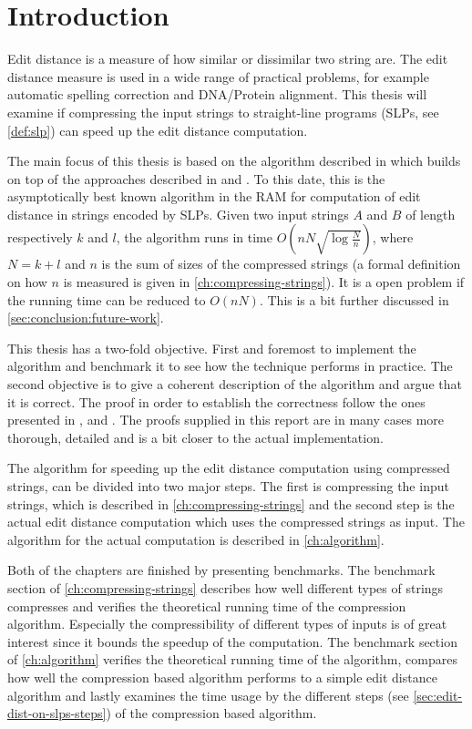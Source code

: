 \documentclass[twoside,11pt,openright]{report}
\begin{document}
\chapter{Introduction}
\label{ch:intro}
Edit distance is a measure of how similar or dissimilar two string are. The edit distance measure is used in a wide range of practical problems, for example automatic spelling correction and DNA/Protein alignment. This thesis will examine if compressing the input strings to straight-line programs (SLPs, see \cref{def:slp}) can speed up the edit distance computation.

The main focus of this thesis is based on the algorithm described in \cite{Gawrychowski:2012:FAC:2422024.2422048} which builds on top of the approaches described in \cite{DBLP:journals/corr/abs-1004-1194} and \cite{DBLP:journals/corr/abs-0707-3619}. To this date, this is the asymptotically best known algorithm in the RAM for computation of edit distance in strings encoded by SLPs. Given two input strings $A$ and $B$ of length respectively $k$ and $l$, the algorithm runs in time $O(n N \sqrt{\log{\frac{N}{n}}})$, where $N = k + l$ and $n$ is the sum of sizes of the compressed strings (a formal definition on how $n$ is measured is given in \cref{ch:compressing-strings}). It is a open problem if the running time can be reduced to $O(nN)$. This is a bit further discussed in \cref{sec:conclusion:future-work}.

This thesis has a two-fold objective. First and foremost to implement the algorithm and benchmark it to see how the technique performs in practice. The second objective is to give a coherent description of the algorithm and argue that it is correct. The proof in order to establish the correctness follow the ones presented in \cite{DBLP:journals/corr/abs-0707-3619}, \cite{Gawrychowski:2012:FAC:2422024.2422048} and \cite{Tiskin:2010:FDM:1873601.1873704}. The proofs supplied in this report are in many cases more thorough, detailed and is a bit closer to the actual implementation.

The algorithm for speeding up the edit distance computation using compressed strings, can be divided into two major steps. The first is compressing the input strings, which is described in \cref{ch:compressing-strings} and the second step is the actual edit distance computation which uses the compressed strings as input. The algorithm for the actual computation is described in \cref{ch:algorithm}.

Both of the chapters are finished by presenting benchmarks. The benchmark section of \cref{ch:compressing-strings} describes how well different types of strings compresses and verifies the theoretical running time of the compression algorithm. Especially the compressibility of different types of inputs is of great interest since it bounds the speedup of the computation. The benchmark section of \cref{ch:algorithm} verifies the theoretical running time of the algorithm, compares how well the compression based algorithm performs to a simple edit distance algorithm and lastly examines the time usage by the different steps (see \cref{sec:edit-dist-on-slps-steps}) of the compression based algorithm.
\end{document}
